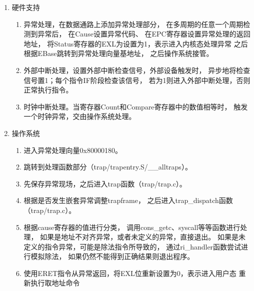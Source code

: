             \begin{enumerate}
            \item
            硬件支持
                \begin{enumerate}
                \item
                异常处理，在数据通路上添加异常处理部分，%
                在多周期的任意一个周期检测到异常后，%
                在Cause设置异常代码、%
                在EPC寄存器设置异常处理的返回地址，%
                将Status寄存器的EXL为设置为1，表示进入内核态处理异常%
                之后根据EBase跳转到异常处理向量基地址，%
                之后操作系统接管。
                \item
                外部中断处理，设置外部中断检查信号，外部设备触发时，%
                异步地将检查信号置1；每个指令IF阶段检查该信号，%
                若为1则进入外部中断处理，否则正常执行指令。
                \item
                时钟中断处理。当寄存器Count和Compare寄存器中的数值相等时，%
                触发一个时钟异常，交由操作系统处理。
                \end{enumerate}
            \item
            操作系统
                \begin{enumerate}
                \item
                进入异常处理向量0x80000180。
                \item
                跳转到处理函数部分（trap/trapentry.S/__alltraps）。
                \item
                先保存异常现场，之后进入trap函数（trap/trap.c）。
                \item
                根据是否发生嵌套异常调整trapframe，%
                之后进入trap_dispatch函数（trap/trap.c）。
                \item
                根据cause寄存器的值进行分类，%
                调用cons\_getc、syscall等等函数进行处理，%
                如果是地址不对齐异常，或者未定义的异常，直接退出。%
                如果是未定义的指令异常，可能是除法指令所导致的，%
                通过ri\_handler函数尝试进行模拟除法，%
                如果仍然不能得到正确结果则退出程序。
                \item
                使用ERET指令从异常返回，将EXL位重新设置为0，表示进入用户态
                重新执行取地址命令
                \end{enumerate}
            \end{enumerate}


